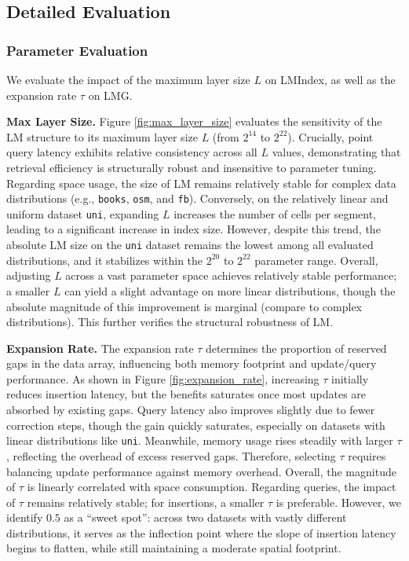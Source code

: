 \subsection{Detailed Evaluation}
\subsubsection{Parameter Evaluation}
\label{sec:param-eval}
We evaluate the impact of the maximum layer size $\mathit{L}$ on LMIndex, as well as the expansion rate $\tau$ on LMG.

\textbf{Max Layer Size.} Figure \ref{fig:max_layer_size} evaluates the sensitivity of the LM structure to its maximum layer size $\mathit{L}$ (from $2^{14}$ to $2^{22}$). Crucially, point query latency exhibits relative consistency across all $\mathit{L}$ values, demonstrating that retrieval efficiency is structurally robust and insensitive to parameter tuning. Regarding space usage, the size of LM remains relatively stable for complex data distributions (e.g., \texttt{books}, \texttt{osm}, and \texttt{fb}). Conversely, on the relatively linear and uniform dataset \texttt{uni}, expanding $\mathit{L}$ increases the number of cells per segment, leading to a significant increase in index size. However, despite this trend, the absolute LM size on the \texttt{uni} dataset remains the lowest among all evaluated distributions, and it stabilizes within the $2^{20}$ to $2^{22}$ parameter range. Overall, adjusting $\mathit{L}$ across a vast parameter space achieves relatively stable performance; a smaller $\mathit{L}$ can yield a slight advantage on more linear distributions, though the absolute magnitude of this improvement is marginal (compare to complex distributions). This further verifies the structural robustness of LM.

\textbf{Expansion Rate.} The expansion rate $\tau$ determines the proportion of reserved gaps in the data array, influencing both memory footprint and update/query performance. As shown in Figure \ref{fig:expansion_rate}, increasing $\tau$ initially reduces insertion latency, but the benefits saturates once most updates are absorbed by existing gaps. Query latency also improves slightly due to fewer correction steps, though the gain quickly saturates, especially on datasets with linear distributions like \texttt{uni}. Meanwhile, memory usage rises steadily with larger $\tau$, reflecting the overhead of excess reserved gaps. Therefore, selecting $\tau$ requires balancing update performance against memory overhead. Overall, the magnitude of $\tau$ is linearly correlated with space consumption. Regarding queries, the impact of $\tau$ remains relatively stable; for insertions, a smaller $\tau$ is preferable. However, we identify $0.5$ as a ``sweet spot'': across two datasets with vastly different distributions, it serves as the inflection point where the slope of insertion latency begins to flatten, while still maintaining a moderate spatial footprint.

